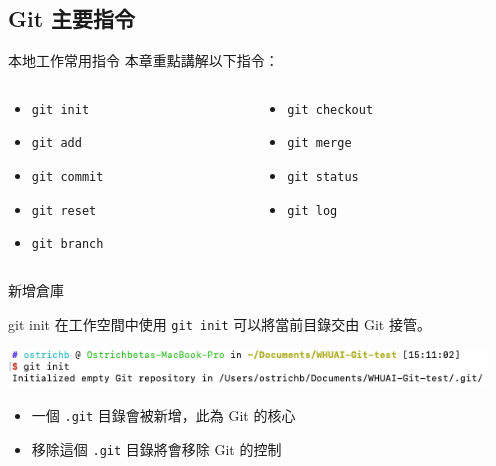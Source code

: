 \documentclass[xetex, unicode, 10pt, aspectratio=169]{beamer}
\begin{document}
\subsection{Git 主要指令}

\begin{frame}{本地工作常用指令}
    本章重點講解以下指令：
    \begin{columns}
        \begin{column}{0.3\textwidth}
            \begin{itemize}
                \item \texttt{git init}
                \item \texttt{git add}
                \item \texttt{git commit}
                \item \texttt{git reset}
                \item \texttt{git branch}
            \end{itemize}
        \end{column}

        \begin{column}{0.3\textwidth}
            \begin{itemize}
                \item \texttt{git checkout}
                \item \texttt{git merge}
                \item \texttt{git status}
                \item \texttt{git log}
            \end{itemize}
        \end{column}
    \end{columns}
\end{frame}

\begin{frame}{新增倉庫}
    \begin{block}{git init}
        在工作空間中使用 \texttt{git init} 可以將當前目錄交由 Git 接管。
    \end{block}
    \begin{center}
        \includegraphics[width=5in]{./img/git-init.png}
    \end{center}
    \pause
    \begin{itemize}
        \item 一個 \texttt{.git} 目錄會被新增，此為 Git 的核心
        \item 移除這個 \texttt{.git} 目錄將會移除 Git 的控制\\
    \end{itemize}
\end{frame}
\end{document}
